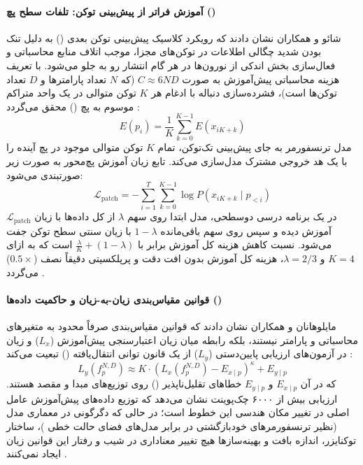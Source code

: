\paragraph*{آموزش فراتر از پیش‌بینی توکن: تلفات سطح پچ ()}
شائو و همکاران \cite{shao2025beyond} نشان دادند که رویکرد کلاسیک پیش‌بینی توکن بعدی () به دلیل تنک بودن شدید چگالی اطلاعات در توکن‌های مجزا، موجب اتلاف منابع محاسباتی و فعال‌سازی بخش اندکی از نورون‌ها در هر گام انتشار رو به جلو می‌شود. با تعریف هزینه محاسباتی پیش‌آموزش به صورت $C \approx 6ND$ (که $N$ تعداد پارامترها و $D$ تعداد توکن‌ها است)، فشرده‌سازی دنباله با ادغام هر $K$ توکن متوالی در یک واحد متراکم موسوم به پچ () محقق می‌گردد \cite{shao2025beyond}:
\begin{equation}
    E(p_i) = \frac{1}{K} \sum_{k=0}^{K-1} E(x_{iK+k})
\end{equation}
مدل ترنسفورمر به جای پیش‌بینی تک‌توکن، تمام $K$ توکن متوالی موجود در پچ آینده را با یک هد خروجی مشترک مدل‌سازی می‌کند. تابع زیان آموزش پچ‌محور به صورت زیر صورتبندی می‌شود:
\begin{equation}
    \mathcal{L}_{\text{patch}} = - \sum_{i=1}^{T} \sum_{k=0}^{K-1} \log P(x_{iK+k} \mid p_{<i})
\end{equation}
در یک برنامه درسی دوسطحی، مدل ابتدا روی سهم $\lambda$ از کل داده‌ها با زیان $\mathcal{L}_{\text{patch}}$ آموزش دیده و سپس روی سهم باقی‌مانده $1-\lambda$ با زیان سنتی سطح توکن جفت می‌شود. نسبت کاهش هزینه کل آموزش برابر با $\frac{\lambda}{K} + (1 - \lambda)$ است که به ازای $K=4$ و $\lambda=2/3$، هزینه کل آموزش بدون افت دقت و پرپلکسیتی دقیقاً نصف ($0.5\times$) می‌گردد \cite{shao2025beyond}.

\paragraph*{قوانین مقیاس‌بندی زیان-به-زیان و حاکمیت داده‌ها ()}
مایلوهانان و همکاران \cite{mayilvahanan2025llms} نشان دادند که قوانین مقیاس‌بندی صرفاً محدود به متغیرهای محاسباتی و پارامتر نیستند، بلکه رابطه میان زیان اعتبارسنجی پیش‌آموزش ($L_x$) و زیان در آزمون‌های ارزیابی پایین‌دستی ($L_y$) از یک قانون توانی انتقال‌یافته () تبعیت می‌کند \cite{mayilvahanan2025llms}:
\begin{equation}
    L_y(f_p^{N,D}) \approx K \cdot \left( L_x(f_p^{N,D}) - E_{x \mid p} \right)^\kappa + E_{y \mid p}
\end{equation}
که در آن $E_{x \mid p}$ و $E_{y \mid p}$ خطاهای تقلیل‌ناپذیر () روی توزیع‌های مبدا و مقصد هستند. ارزیابی بیش از ۶۰۰۰ چک‌پوینت نشان می‌دهد که توزیع داده‌های پیش‌آموزش عامل اصلی در تغییر مکان هندسی این خطوط است؛ در حالی که دگرگونی در معماری مدل (نظیر ترنسفورمرهای خودبازگشتی در برابر مدل‌های فضای حالت خطی )، ساختار توکنایزر، اندازه بافت و بهینه‌سازها هیچ تغییر معناداری در شیب و رفتار این قوانین زیان ایجاد نمی‌کنند \cite{mayilvahanan2025llms}.

